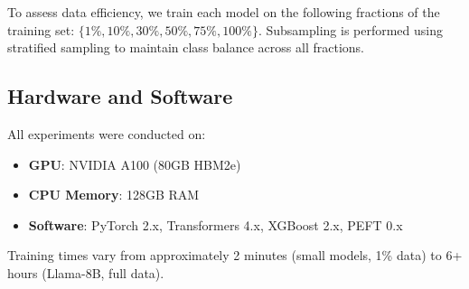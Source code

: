 To assess data efficiency, we train each model on the following fractions of the training set: $\{1\%, 10\%, 30\%, 50\%, 75\%, 100\%\}$. Subsampling is performed using stratified sampling to maintain class balance across all fractions.

\subsection{Hardware and Software}
\label{appendix:hardware}

All experiments were conducted on:
\begin{itemize}
    \item \textbf{GPU}: NVIDIA A100 (80GB HBM2e)
    \item \textbf{CPU Memory}: 128GB RAM
    \item \textbf{Software}: PyTorch 2.x, Transformers 4.x, XGBoost 2.x, PEFT 0.x
\end{itemize}

Training times vary from approximately 2 minutes (small models, 1\% data) to 6+ hours (Llama-8B, full data).


